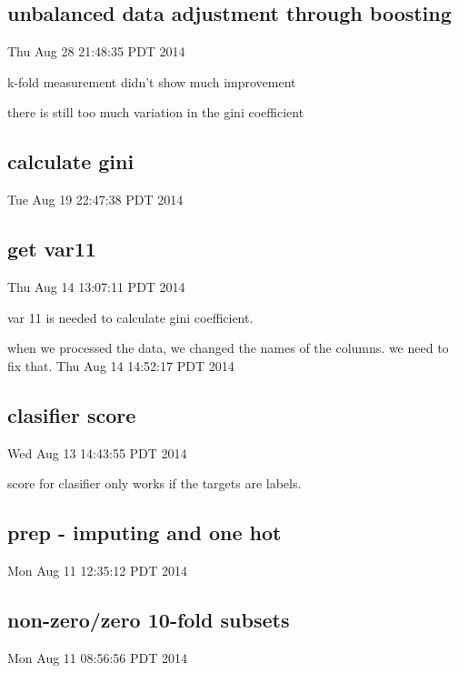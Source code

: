 \documentclass{article}
\begin{document}
\subsection{unbalanced data adjustment through boosting}
Thu Aug 28 21:48:35 PDT 2014

k-fold measurement didn't show much improvement

there is still too much variation in the gini coefficient 

\subsection{calculate gini}
Tue Aug 19 22:47:38 PDT 2014
\subsection{get var11}
Thu Aug 14 13:07:11 PDT 2014

var 11 is needed to calculate gini coefficient.

when we processed the data, we changed the names of the columns. we need to fix that.
Thu Aug 14 14:52:17 PDT 2014
\subsection{clasifier score}
Wed Aug 13 14:43:55 PDT 2014

score for clasifier only works if the targets are labels.
\subsection{prep - imputing and one hot}
Mon Aug 11 12:35:12 PDT 2014
\subsection{non-zero/zero 10-fold subsets}
Mon Aug 11 08:56:56 PDT 2014
\end{document}
